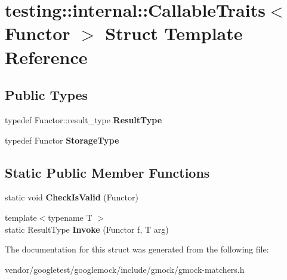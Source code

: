 \hypertarget{structtesting_1_1internal_1_1_callable_traits}{}\section{testing\+:\+:internal\+:\+:Callable\+Traits$<$ Functor $>$ Struct Template Reference}
\label{structtesting_1_1internal_1_1_callable_traits}
\subsection*{Public Types}
\begin{DoxyCompactItemize}
\item 
\mbox{\label{structtesting_1_1internal_1_1_callable_traits_a242d198dd1c56a153ba931d7166ec7f3}} 
typedef Functor\+::result\+\_\+type {\bfseries Result\+Type}
\item 
\mbox{\label{structtesting_1_1internal_1_1_callable_traits_a23cc0c86a3bd18b2f8dd159dd44e1168}} 
typedef Functor {\bfseries Storage\+Type}
\end{DoxyCompactItemize}
\subsection*{Static Public Member Functions}
\begin{DoxyCompactItemize}
\item 
\mbox{\label{structtesting_1_1internal_1_1_callable_traits_ab09a6487235947ec9c5d933d07ac605b}} 
static void {\bfseries Check\+Is\+Valid} (Functor)
\item 
\mbox{\label{structtesting_1_1internal_1_1_callable_traits_ad54471cad61aefbe15de330867ff5936}} 
{\footnotesize template$<$typename T $>$ }\\static Result\+Type {\bfseries Invoke} (Functor f, T arg)
\end{DoxyCompactItemize}


The documentation for this struct was generated from the following file\+:\begin{DoxyCompactItemize}
\item 
vendor/googletest/googlemock/include/gmock/gmock-\/matchers.\+h\end{DoxyCompactItemize}
